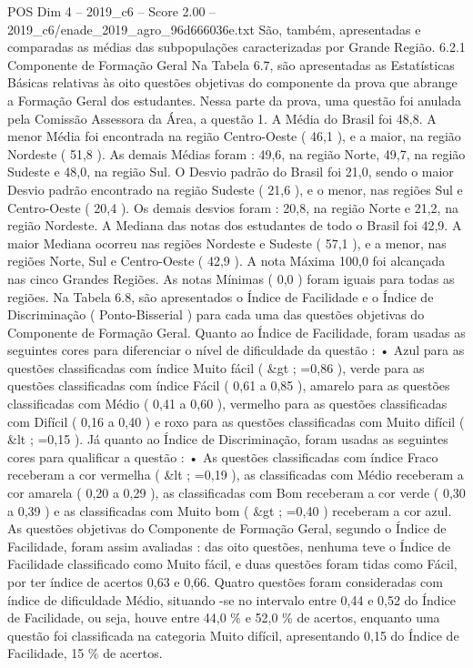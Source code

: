 \begin{textsample}{POS Dim 4 – 2019\_c6 – Score 2.00 – 2019\_c6/enade\_2019\_agro\_96d666036e.txt}
São, também, apresentadas e comparadas as médias das subpopulações caracterizadas por Grande Região. 6.2.1 Componente de Formação Geral Na Tabela 6.7, são apresentadas as Estatísticas Básicas relativas às oito questões objetivas do componente da prova que abrange a Formação Geral dos estudantes.
Nessa parte da prova, uma questão foi anulada pela Comissão Assessora da Área, a questão 1.
A Média do Brasil foi 48,8.
A menor Média foi encontrada na região Centro-Oeste ( 46,1 ), e a maior, na região Nordeste ( 51,8 ).
As demais Médias foram : 49,6, na região Norte, 49,7, na região Sudeste e 48,0, na região Sul.
O Desvio padrão do Brasil foi 21,0, sendo o maior Desvio padrão encontrado na região Sudeste ( 21,6 ), e o menor, nas regiões Sul e Centro-Oeste ( 20,4 ).
Os demais desvios foram : 20,8, na região Norte e 21,2, na região Nordeste.
A Mediana das notas dos estudantes de todo o Brasil foi 42,9.
A maior Mediana ocorreu nas regiões Nordeste e Sudeste ( 57,1 ), e a menor, nas regiões Norte, Sul e Centro-Oeste ( 42,9 ).
A nota Máxima 100,0 foi alcançada nas cinco Grandes Regiões.
As notas Mínimas ( 0,0 ) foram iguais para todas as regiões.
Na Tabela 6.8, são apresentados o Índice de Facilidade e o Índice de Discriminação ( Ponto-Bisserial ) para cada uma das questões objetivas do Componente de Formação Geral.
Quanto ao Índice de Facilidade, foram usadas as seguintes cores para diferenciar o nível de dificuldade da questão : • Azul para as questões classificadas com índice Muito fácil ( \&gt ; =0,86 ), verde para as questões classificadas com índice Fácil ( 0,61 a 0,85 ), amarelo para as questões classificadas com Médio ( 0,41 a 0,60 ), vermelho para as questões classificadas com Difícil ( 0,16 a 0,40 ) e roxo para as questões classificadas com Muito difícil ( \&lt ; =0,15 ).
Já quanto ao Índice de Discriminação, foram usadas as seguintes cores para qualificar a questão : • As questões classificadas com índice Fraco receberam a cor vermelha ( \&lt ; =0,19 ), as classificadas com Médio receberam a cor amarela ( 0,20 a 0,29 ), as classificadas com Bom receberam a cor verde ( 0,30 a 0,39 ) e as classificadas com Muito bom ( \&gt ; =0,40 ) receberam a cor azul.
As questões objetivas do Componente de Formação Geral, segundo o Índice de Facilidade, foram assim avaliadas : das oito questões, nenhuma teve o Índice de Facilidade classificado como Muito fácil, e duas questões foram tidas como Fácil, por ter índice de acertos 0,63 e 0,66.
Quatro questões foram consideradas com índice de dificuldade Médio, situando -se no intervalo entre 0,44 e 0,52 do Índice de Facilidade, ou seja, houve entre 44,0 \% e 52,0 \% de acertos, enquanto uma questão foi classificada na categoria Muito difícil, apresentando 0,15 do Índice de Facilidade, 15 \% de acertos.

\end{textsample}

